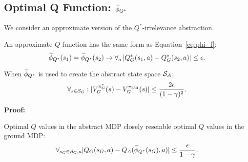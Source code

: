 


\subsection{Optimal Q Function: $\widetilde \phi_{Q^*}$}
\label{sec:Q*}

We consider an approximate version of the $Q^*$-irrelevance abstraction. 

\bdefn{$\epQ$}
An approximate $Q$ function has the same form as Equation~\ref{eq:phi_f}:
\begin{equation}
\widetilde \phi_{Q^*}(s_1) = \widetilde \phi_{Q^*}(s_2) \rightarrow \forall_a \left|Q_G^*(s_1, a) - Q_G^*(s_2, a)\right| \leq \epsilon.
\end{equation}
\edefn

\begin{lma}
\label{lma:Q*}
When $\widetilde \phi_{Q^*}$ is used to create the abstract state space $\mathcal{S}_A$:
\begin{equation}
\forall_{s \in \mathcal{S}_G}: | V_G^{\pi_G^*}(s) - V_G^{\pi_{GA}}(s) | \leq \frac{2\epsilon}{(1-\gamma)^2}.
\end{equation}
\end{lma}

\textbf{Proof:}
\begin{clm}
\label{clm:closeQs}
Optimal $Q$ values in the abstract \ac{MDP} closely resemble optimal $Q$ values in the ground \ac{MDP}:
\begin{equation}
\label{eq:Q*Claim1}
\forall_{s_G \in \mathcal{S}_G, a} |Q_G(s_G, a) - Q_A(\widetilde \phi_{Q^*}(s_G), a)| \leq \frac{\epsilon}{1-\gamma}.
\end{equation}
\end{clm}


